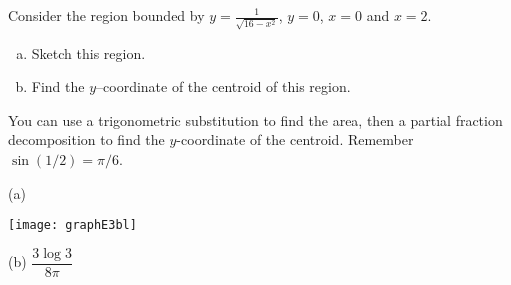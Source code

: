 \begin{question}[1996A]
Consider the region bounded by $y=\frac{1}{\sqrt{16-x^2}}$, $y=0$, $x=0$ and $x=2$.
\begin{enumerate}[(a)]
\item
Sketch this region.
\item
Find the $y$--coordinate of the centroid of this region.
\end{enumerate}
\end{question}
\begin{hint}
You can use a trigonometric substitution to find the area, then a partial fraction decomposition to find the $y$-coordinate of the centroid. Remember $\sin(1/2)=\pi/6$.
\end{hint}
\begin{answer} (a)

\begin{center}
       \texttt{[image: graphE3bl]}
\end{center}

\noindent (b) $\dfrac{3\log 3}{8\pi}$
\end{answer}
